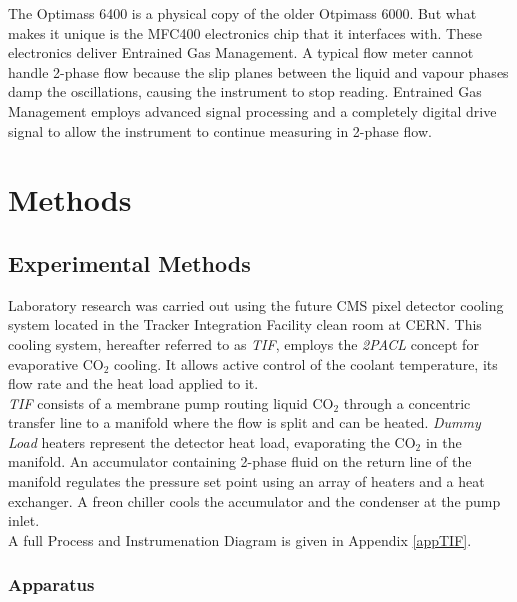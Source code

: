 \documentclass{report}
\begin{document}
The Optimass 6400 is a physical copy of the older Otpimass 6000. But what makes it unique is the MFC400 electronics chip that it interfaces with. These electronics deliver Entrained Gas Management. A typical flow meter cannot handle 2-phase flow because the slip planes between the liquid and vapour phases damp the oscillations, causing the instrument to stop reading. Entrained Gas Management employs advanced signal processing and a completely digital drive signal to allow the instrument to continue measuring in 2-phase flow. \cite{krohne brochure}\cite{processArticle}\\



\chapter{Methods} \label{methods}
\section{Experimental Methods}
Laboratory research was carried out using the future CMS pixel detector cooling system located in the Tracker Integration Facility clean room at CERN. This cooling system, hereafter referred to as \textit{TIF}, employs the \textit{2PACL} concept for evaporative CO$_2$ cooling. It allows active control of the coolant temperature, its flow rate and the heat load applied to  it. \\
\textit{TIF} consists of a membrane pump routing liquid CO$_2$ through a concentric transfer line to a manifold where the flow is split and can be heated. \textit{Dummy Load} heaters represent the detector heat load, evaporating the CO$_2$ in the manifold. An accumulator containing 2-phase fluid on the return line of the manifold regulates the pressure set point using an array of heaters and a heat exchanger. A freon chiller cools the accumulator and the condenser at the pump inlet.\\
A full Process and Instrumenation Diagram is given in Appendix \ref{appTIF}.
\subsection{Apparatus}
\end{document}
